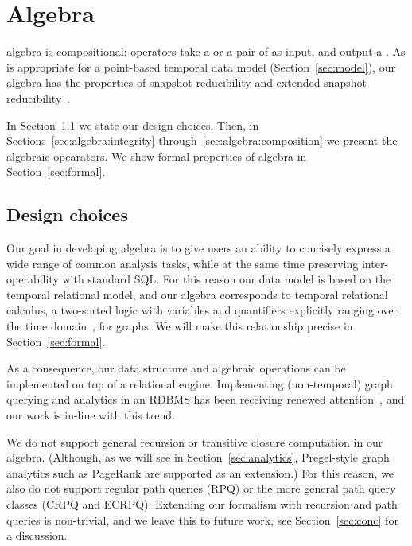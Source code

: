 \section{Algebra}
\label{sec:algebra}
\setlength{\textfloatsep}{5pt}%

\tg algebra is compositional: operators take a \tg or a pair of \tgs
as input, and output a \tg.  As is appropriate for a point-based
temporal data model (Section~\ref{sec:model}), our algebra has the
properties of snapshot reducibility and extended snapshot
reducibility~\cite{DBLP:reference/db/Bohlen092}.

In Section~\ref{sec:algebra:prelim} we state our design choices.
Then, in Sections~\ref{sec:algebra:integrity}
through~\ref{sec:algebra:composition} we present the algebraic
opearators.  We show formal properties of \tg algebra in
Section~\ref{sec:formal}.  

\subsection{Design choices}
\label{sec:algebra:prelim}

Our goal in developing \tg algebra is to give users an ability to
concisely express a wide range of common analysis tasks, while at the
same time preserving inter-operability with standard SQL.  For this
reason our data model is based on the temporal relational model, and
our algebra corresponds to temporal relational calculus, a two-sorted
logic with variables and quantifiers explicitly ranging over the time
domain~\cite{DBLP:reference/db/Toman09}, for graphs.  We will make
this relationship precise in Section~\ref{sec:formal}.

As a consequence, our data structure and algebraic operations can be
implemented on top of a relational engine.  Implementing
(non-temporal) graph querying and analytics in an RDBMS has been
receiving renewed
attention~\cite{DBLP:conf/sigmod/AbergerTOR16,DBLP:conf/sigmod/SunFSKHX15,DBLP:journals/pvldb/Xirogiannopoulos15},
and our work is in-line with this trend.


We do not support general recursion or transitive closure
computation in our algebra. (Although, as we will see in
Section~\ref{sec:analytics}, Pregel-style graph analytics such as
PageRank are supported as an extension.)  For this reason, we also do
not support regular path queries (RPQ) or the more general path query
classes (CRPQ and ECRPQ).  Extending our formalism with recursion and
path queries is non-trivial, and we leave this to future work, see
Section~\ref{sec:conc} for a discussion.

